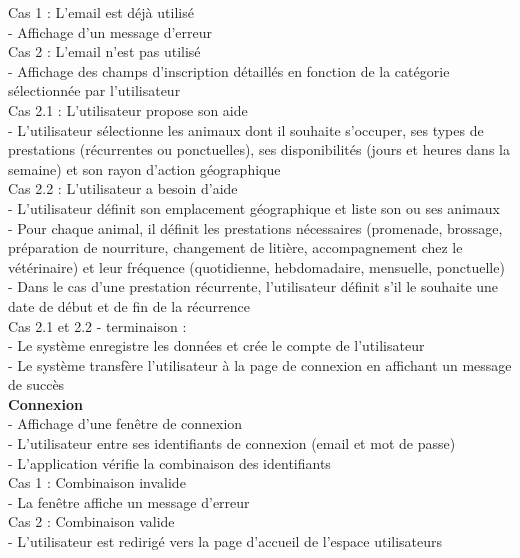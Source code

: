 \documentclass[conference]{IEEEtran}
\begin{document}
Cas 1 : L'email est déjà utilisé\\
- Affichage d'un message d'erreur\\

Cas 2 : L'email n'est pas utilisé\\
- Affichage des champs d'inscription détaillés en fonction de la catégorie sélectionnée par l'utilisateur\\

Cas 2.1 : L'utilisateur propose son aide\\
- L'utilisateur sélectionne les animaux dont il souhaite s'occuper, ses types de prestations (récurrentes ou ponctuelles), ses disponibilités (jours et heures dans la semaine) et son rayon d'action géographique\\

Cas 2.2 : L'utilisateur a besoin d'aide\\
- L'utilisateur définit son emplacement géographique et liste son ou ses animaux\\
- Pour chaque animal, il définit les prestations nécessaires (promenade, brossage, préparation de nourriture, changement de litière, accompagnement chez le vétérinaire) et leur fréquence (quotidienne, hebdomadaire, mensuelle, ponctuelle)\\
- Dans le cas d'une prestation récurrente, l'utilisateur définit s'il le souhaite une date de début et de fin de la récurrence\\

Cas 2.1 et 2.2 - terminaison :\\
- Le système enregistre les données et crée le compte de l'utilisateur\\
- Le système transfère l'utilisateur à la page de connexion en affichant un message de succès\\

\textbf{Connexion}\\
- Affichage d'une fenêtre de connexion\\
- L'utilisateur entre ses identifiants de connexion (email et mot de passe)\\
- L'application vérifie la combinaison des identifiants\\

Cas 1 : Combinaison invalide\\
- La fenêtre affiche un message d'erreur\\
Cas 2 : Combinaison valide\\
- L'utilisateur est redirigé vers la page d'accueil de l'espace utilisateurs\\
\end{document}
